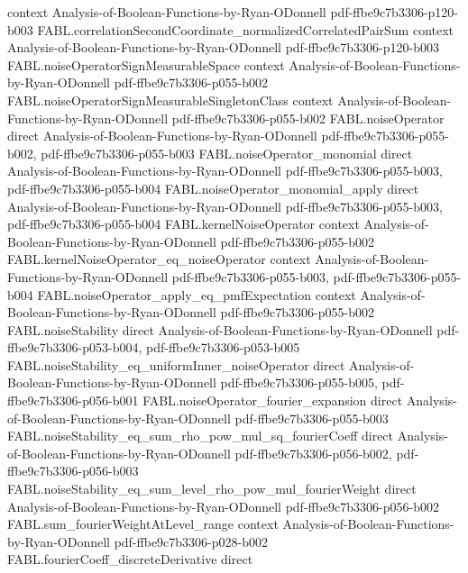 \begin{theorem}
  {context}
  {Analysis-of-Boolean-Functions-by-Ryan-ODonnell}
  {pdf-ffbe9c7b3306-p120-b003}
\proofstep
  {FABL.correlationSecondCoordinate_normalizedCorrelatedPairSum}
  {context}
  {Analysis-of-Boolean-Functions-by-Ryan-ODonnell}
  {pdf-ffbe9c7b3306-p120-b003}
\proofstep
  {FABL.noiseOperatorSignMeasurableSpace}
  {context}
  {Analysis-of-Boolean-Functions-by-Ryan-ODonnell}
  {pdf-ffbe9c7b3306-p055-b002}
\proofstep
  {FABL.noiseOperatorSignMeasurableSingletonClass}
  {context}
  {Analysis-of-Boolean-Functions-by-Ryan-ODonnell}
  {pdf-ffbe9c7b3306-p055-b002}
\proofstep
  {FABL.noiseOperator}
  {direct}
  {Analysis-of-Boolean-Functions-by-Ryan-ODonnell}
  {pdf-ffbe9c7b3306-p055-b002,
    pdf-ffbe9c7b3306-p055-b003}
\proofstep
  {FABL.noiseOperator_monomial}
  {direct}
  {Analysis-of-Boolean-Functions-by-Ryan-ODonnell}
  {pdf-ffbe9c7b3306-p055-b003,
    pdf-ffbe9c7b3306-p055-b004}
\proofstep
  {FABL.noiseOperator_monomial_apply}
  {direct}
  {Analysis-of-Boolean-Functions-by-Ryan-ODonnell}
  {pdf-ffbe9c7b3306-p055-b003,
    pdf-ffbe9c7b3306-p055-b004}
\proofstep
  {FABL.kernelNoiseOperator}
  {context}
  {Analysis-of-Boolean-Functions-by-Ryan-ODonnell}
  {pdf-ffbe9c7b3306-p055-b002}
\proofstep
  {FABL.kernelNoiseOperator_eq_noiseOperator}
  {context}
  {Analysis-of-Boolean-Functions-by-Ryan-ODonnell}
  {pdf-ffbe9c7b3306-p055-b003,
    pdf-ffbe9c7b3306-p055-b004}
\proofstep
  {FABL.noiseOperator_apply_eq_pmfExpectation}
  {context}
  {Analysis-of-Boolean-Functions-by-Ryan-ODonnell}
  {pdf-ffbe9c7b3306-p055-b002}
\proofstep
  {FABL.noiseStability}
  {direct}
  {Analysis-of-Boolean-Functions-by-Ryan-ODonnell}
  {pdf-ffbe9c7b3306-p053-b004,
    pdf-ffbe9c7b3306-p053-b005}
\proofstep
  {FABL.noiseStability_eq_uniformInner_noiseOperator}
  {direct}
  {Analysis-of-Boolean-Functions-by-Ryan-ODonnell}
  {pdf-ffbe9c7b3306-p055-b005,
    pdf-ffbe9c7b3306-p056-b001}
\proofstep
  {FABL.noiseOperator_fourier_expansion}
  {direct}
  {Analysis-of-Boolean-Functions-by-Ryan-ODonnell}
  {pdf-ffbe9c7b3306-p055-b003}
\proofstep
  {FABL.noiseStability_eq_sum_rho_pow_mul_sq_fourierCoeff}
  {direct}
  {Analysis-of-Boolean-Functions-by-Ryan-ODonnell}
  {pdf-ffbe9c7b3306-p056-b002,
    pdf-ffbe9c7b3306-p056-b003}
\proofstep
  {FABL.noiseStability_eq_sum_level_rho_pow_mul_fourierWeight}
  {direct}
  {Analysis-of-Boolean-Functions-by-Ryan-ODonnell}
  {pdf-ffbe9c7b3306-p056-b002}
\proofstep
  {FABL.sum_fourierWeightAtLevel_range}
  {context}
  {Analysis-of-Boolean-Functions-by-Ryan-ODonnell}
  {pdf-ffbe9c7b3306-p028-b002}
\proofstep
  {FABL.fourierCoeff_discreteDerivative}
  {direct}

\end{theorem}
